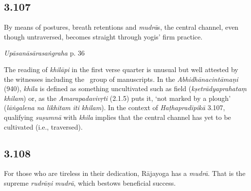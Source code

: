 \begin{ekdosis}


\subsection*{3.107}
\begin{translation}[hp03_107]
By means of postures, breath retentions and \emph{mudrā}s, the central channel, even though untraversed, becomes straight through yogis' firm practice.
\end{translation}
%


\begin{testimonia}[hp03_107]
\emph{Upāsanāsārasaṅgraha} p. 36 %
\begin{versinnote}
\end{versinnote}
\end{testimonia}

\begin{philcomm}[hp03_107]
The reading of \emph{khilāpi} in the first verse quarter is unusual but well attested by the witnesses including the \textalpha\ group of manuscripts. In the \emph{Abhidhāna\-cintāmaṇi} (940), \emph{khila} is defined as something uncultivated such as field (\emph{kṣetrādyaprahataṃ khilam}) or, as the \emph{Amarapadavivṛti} (2.1.5) puts it, `not marked by a plough' (\emph{lāṅgalena na likhitam iti khilam}). In the context of \emph{Haṭhapradīpikā} 3.107, qualifying \emph{suṣumnā} with \emph{khila} implies that the central channel has yet to be cultivated (i.e., traversed).



\end{philcomm}


\subsection*{3.108}
\begin{translation}[hp03_108]
For those who are tireless in their dedication, Rājayoga has a \emph{mudrā}. That is the supreme \emph{rudrāṇi} \emph{mudrā}, which bestows beneficial success.
\end{translation}


\end{ekdosis}
